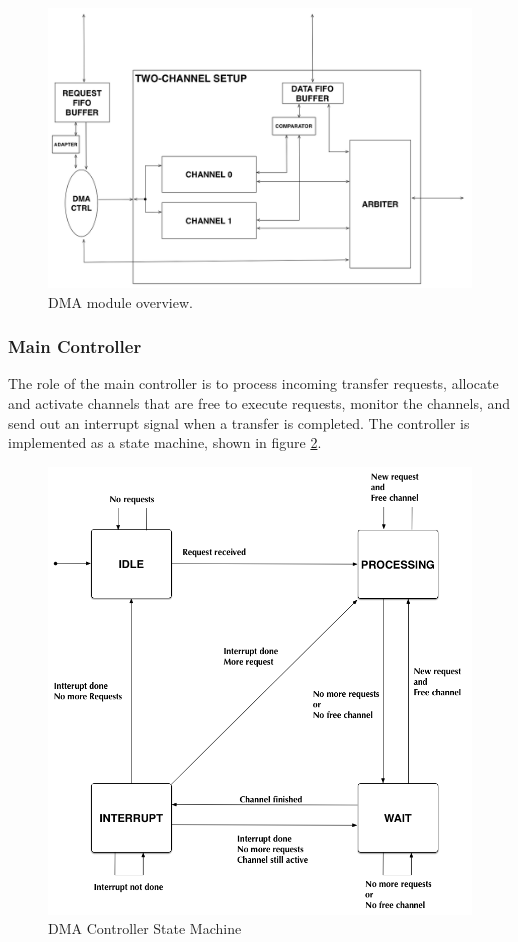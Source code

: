 \begin{figure}[htb]
    \centering
    \includegraphics[width=1\textwidth]{Figures/DMA/TopViewFinalSimple2}
    \caption{DMA module overview. }
    \label{fig:DMATopView2}
\end{figure}

\subsubsection{Main Controller}
The role of the main controller is to process incoming transfer requests, allocate and activate
channels that are free to execute requests, monitor the channels, and send out an interrupt signal
when a transfer is completed.
The controller is implemented as a state machine, shown in figure \ref{fig:DMAControllerStateMachineSimple2}.

\begin{figure}[htb]
    \centering
    \includegraphics[width=1\textwidth]{Figures/DMA/StateMachineFinalSimple}
    \caption{DMA Controller State Machine}
    \label{fig:DMAControllerStateMachineSimple2}
\end{figure}

